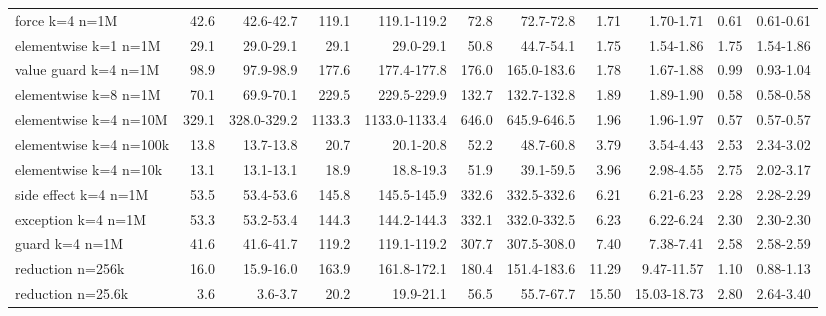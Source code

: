 \begin{tabular}{lrrrrrrrrrr}
force k=4 n=1M & 42.6 & 42.6-42.7 & 119.1 & 119.1-119.2 & 72.8 & 72.7-72.8 & 1.71 & 1.70-1.71 & 0.61 & 0.61-0.61 \\
elementwise k=1 n=1M & 29.1 & 29.0-29.1 & 29.1 & 29.0-29.1 & 50.8 & 44.7-54.1 & 1.75 & 1.54-1.86 & 1.75 & 1.54-1.86 \\
value guard k=4 n=1M & 98.9 & 97.9-98.9 & 177.6 & 177.4-177.8 & 176.0 & 165.0-183.6 & 1.78 & 1.67-1.88 & 0.99 & 0.93-1.04 \\
elementwise k=8 n=1M & 70.1 & 69.9-70.1 & 229.5 & 229.5-229.9 & 132.7 & 132.7-132.8 & 1.89 & 1.89-1.90 & 0.58 & 0.58-0.58 \\
elementwise k=4 n=10M & 329.1 & 328.0-329.2 & 1133.3 & 1133.0-1133.4 & 646.0 & 645.9-646.5 & 1.96 & 1.96-1.97 & 0.57 & 0.57-0.57 \\
elementwise k=4 n=100k & 13.8 & 13.7-13.8 & 20.7 & 20.1-20.8 & 52.2 & 48.7-60.8 & 3.79 & 3.54-4.43 & 2.53 & 2.34-3.02 \\
elementwise k=4 n=10k & 13.1 & 13.1-13.1 & 18.9 & 18.8-19.3 & 51.9 & 39.1-59.5 & 3.96 & 2.98-4.55 & 2.75 & 2.02-3.17 \\
side effect k=4 n=1M & 53.5 & 53.4-53.6 & 145.8 & 145.5-145.9 & 332.6 & 332.5-332.6 & 6.21 & 6.21-6.23 & 2.28 & 2.28-2.29 \\
exception k=4 n=1M & 53.3 & 53.2-53.4 & 144.3 & 144.2-144.3 & 332.1 & 332.0-332.5 & 6.23 & 6.22-6.24 & 2.30 & 2.30-2.30 \\
guard k=4 n=1M & 41.6 & 41.6-41.7 & 119.2 & 119.1-119.2 & 307.7 & 307.5-308.0 & 7.40 & 7.38-7.41 & 2.58 & 2.58-2.59 \\
reduction n=256k & 16.0 & 15.9-16.0 & 163.9 & 161.8-172.1 & 180.4 & 151.4-183.6 & 11.29 & 9.47-11.57 & 1.10 & 0.88-1.13 \\
reduction n=25.6k & 3.6 & 3.6-3.7 & 20.2 & 19.9-21.1 & 56.5 & 55.7-67.7 & 15.50 & 15.03-18.73 & 2.80 & 2.64-3.40 \\
\bottomrule
\end{tabular}
